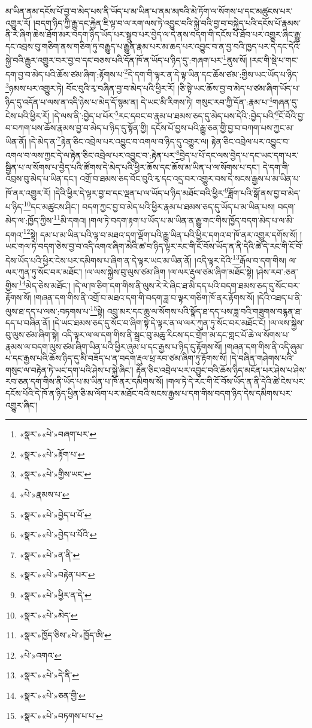 མ་ཡིན་ནམ་དངོས་པོ་བྱ་བ་མེད་པས་ནི་ཡོད་པ་མ་ཡིན་པ་ནམ་མཁའི་མེ་ཏོག་ལ་སོགས་པ་དང་མཚུངས་པར་འགྱུར་རོ། །བདག་ཉིད་ཀྱི་རྒྱུ་དང་རྐྱེན་ཇི་ལྟ་བ་ལ་རག་ལས་ཏེ་འབྱུང་བའི་སྐྱེ་བའི་བྱ་བ་བསྐྱེད་པའི་དངོས་པོ་རྣམས་ནི་རེ་ཞིག་ཆེས་ཐོག་མར་བདག་ཉིད་ཡོད་པར་སྒྲུབ་པར་བྱེད་ལ་དེ་ནས་བདག་གི་དངོས་པོ་ཐོབ་པར་འགྱུར་ཞིང་རྒྱུ་དང་འབྲས་བུ་གཅིག་ནས་གཅིག་ཏུ་བརྒྱུད་པ་རྒྱུན་རྣམ་པར་མ་ཆད་པར་འབྱུང་བ་ན་བྱ་བའི་ཁྱད་པར་དེ་དང་དེའི་སྐྱེ་བའི་རྒྱུར་འགྱུར་བར་བྱ་བ་དང་བཅས་པའི་དོན་ཁོ་ན་ཡོད་པ་ཉིད་དུ་:གཞག་པར་\footnote{«སྣར་»«པེ་»བཞག་པར་}ནུས་སོ། །རང་གི་སྡེ་པ་གང་དག་བྱ་བ་མེད་པའི་ཆོས་ཙམ་ཞིག་:རྟོགས་པ་\footnote{«སྣར་»«པེ་»རྟོག་པ་}དེ་དག་གི་ལྟར་ན་དེ་ལྟ་ཡིན་དང་ཆོས་ཙམ་:གྱིས་ཡང་ཡོད་པ་ཉིད་\footnote{«སྣར་»«པེ་»གྱིས་ཡང་}ཉམས་པར་འགྱུར་ཏེ། བོང་བུའི་རྭ་བཞིན་བྱ་བ་མེད་པའི་ཕྱིར་རོ། །ཅི་སྟེ་ཡང་ཆོས་བྱ་བ་མེད་པ་ཙམ་ཞིག་ཡོད་པ་ཉིད་དུ་འདོན་པ་ལས་ན་འདི་ཉེས་པ་མེད་དོ་སྙམ་ན། དེ་ཡང་མི་རིགས་ཏེ། གསུང་རབ་ཀྱི་དོན་:རྣམ་པ་\footnote{«པེ་»རྣམས་པ་}གཞན་དུ་ངེས་པའི་ཕྱིར་རོ། །དེ་ལས་ནི་:བྱེད་པ་པོར་\footnote{«སྣར་»«པེ་»བྱེད་པ་པོ་}རང་དབང་བ་རྣམ་པ་ཐམས་ཅད་དུ་མེད་པས་དེའི་:བྱེད་པའི་\footnote{«སྣར་»«པེ་»བྱེད་པ་པོའི་}ངོ་བོའི་བྱ་བ་བཀག་པས་ཆོས་རྣམས་བྱ་བ་མེད་པ་ཉིད་དུ་སྟོན་གྱི། དངོས་པོ་བྱས་པའི་རྒྱུ་ཅན་གྱི་བྱ་བ་བཀག་པས་ཀྱང་མ་ཡིན་ནོ། །དེ་མེད་ན་\footnote{«སྣར་»«པེ་»ན་ནི་}རྟེན་ཅིང་འབྲེལ་པར་འབྱུང་བ་འགལ་བ་ཉིད་དུ་འགྱུར་ལ། རྟེན་ཅིང་འབྲེལ་པར་འབྱུང་བ་འགལ་བ་ལས་ཀྱང་དེ་ལ་རྟེན་ཅིང་འབྲེལ་པར་འབྱུང་བ་:རྟེན་པར་\footnote{«སྣར་»«པེ་»བརྟེན་པར་}བྱེད་པ་པོ་དང་ལས་བྱེད་པ་དང་ཡང་དག་པར་སྦྱིན་པ་ལ་སོགས་པ་བྱེད་པའི་ཚོགས་དེ་མེད་པའི་ཕྱིར་ཆོས་དང་ཆོས་མ་ཡིན་པ་ལ་སོགས་པ་དང་། དེ་དག་གི་འབྲས་བུ་མེད་པ་ཡིན་དང་། འགྲོ་བ་ཐམས་ཅད་བོང་བུའི་རྭ་དང་འདྲ་བར་འགྱུར་བས་དེ་སངས་རྒྱས་པ་མ་ཡིན་པ་ཁོ་ནར་འགྱུར་རོ། །དེའི་ཕྱིར་དེ་ལྟར་བྱ་བ་དང་ལྡན་པ་ལ་ཡོད་པ་ཉིད་མཐོང་བའི་ཕྱིར་\footnote{«སྣར་»«པེ་»ཕྱིར་ན་དེ་}ཟློག་པའི་སྒོ་ནས་བྱ་བ་མེད་པ་ཉིད་\footnote{«སྣར་»«པེ་»མེད་}དང་མཚུངས་ཤིང་། བདག་ཀྱང་བྱ་བ་མེད་པའི་ཕྱིར་རྣམ་པ་ཐམས་ཅད་དུ་ཡོད་པ་མ་ཡིན་པས། བདག་མེད་ལ་:ཁྱོད་ཀྱིས་\footnote{«སྣར་»ཁྱོད་ཅིས་«པེ་»ཁྱོད་ཨི་}མི་དགའ། །གལ་ཏེ་བདག་རྟག་པ་ཡོད་པ་མ་ཡིན་ན་རྒྱུ་གང་གིས་ཁྱོད་བདག་མེད་པ་ལ་མི་དགའ་\footnote{«པེ་»འགའ་}སྟེ། དམ་པ་མ་ཡིན་པའི་ལྟ་བ་མཐའ་དག་ལྡོག་པའི་རྒྱུ་ཡིན་པའི་ཕྱིར་དགའ་བ་ཁོ་ནར་འགྱུར་དགོས་སོ། །ཡང་གལ་ཏེ་བདག་ཅེས་བྱ་བ་འདི་འགའ་ཞིག་མེའི་ཚ་བ་ཉིད་ལྟར་རང་གི་ངོ་བོས་ཡོད་ན་ནི་དེའི་ཚེ་དེ་རང་གི་ངོ་བོ་དེས་ཡོད་པའི་ཕྱིར་ངེས་པར་དམིགས་པ་ཞིག་ན་དེ་ལྟར་ཡང་མ་ཡིན་ནོ། །འདི་ལྟར་དེའི་\footnote{«སྣར་»«པེ་»དེ་ནི་}རྒོལ་བ་དག་གིས། ལ་ལར་ཀུན་ཏུ་སོང་བར་མཐོང་། །ལ་ལས་སྐྱེས་བུ་ལུས་ཙམ་ཞིག །ལ་ལར་རྡུལ་ཙམ་ཞིག་མཐོང་སྟེ། །ཤེས་རབ་:ཅན་གྱིས་\footnote{«སྣར་»«པེ་»ཅན་གྱི་}མེད་ཅེས་མཐོང་། །དེ་ལ་ཁ་ཅིག་དག་གིས་ནི་ལུས་རེ་རེ་ཞིང་ཐ་མི་དད་པའི་བདག་ཐམས་ཅད་དུ་སོང་བར་རྟོགས་སོ། །གཞན་དག་གིས་ནི་འགྲོ་བ་མཐའ་དག་གི་བདག་ཟླ་བ་ལྟར་གཅིག་ཁོ་ནར་རྟོགས་སོ། །དེའི་འཐད་པ་ནི་ལུས་ཐ་དད་པ་ལས་:བཏགས་པ་\footnote{«སྣར་»«པེ་»བཏགས་པ་པ་}སྟེ། འབྲུ་མར་དང་ཆུ་ལ་སོགས་པའི་སྣོད་ཐ་དད་པས་ཟླ་བའི་གཟུགས་བརྙན་ཐ་དད་པ་བཞིན་ནོ། །དེ་ཡང་ཐམས་ཅད་དུ་སོང་བ་ཞིག་སྟེ་དེ་ལྟར་ན་ལ་ལར་ཀུན་ཏུ་སོང་བར་མཐོང་ངོ། །ལ་ལས་སྐྱེས་བུ་ལུས་ཙམ་ཞིག་སྟེ། འདི་ལྟར་ལ་ལ་དག་གིས་ནི་སྦྲང་བུ་མཆུ་རིངས་དང་གྲོག་མ་དང་གླང་པོ་ཆེ་ལ་སོགས་པ་རྣམས་ལ་བདག་ལུས་ཙམ་ཞིག་ཡིན་པའི་ཕྱིར་ཞུམ་པ་དང་རྒྱས་པ་ཉིད་དུ་རྟོགས་སོ། །གཞན་དག་གིས་ནི་འདི་ཞུམ་པ་དང་རྒྱས་པའི་ཆོས་ཉིད་དུ་མི་བཟོད་པ་ན་བདག་རྡུལ་ཕྲ་རབ་ཙམ་ཞིག་ཏུ་རྟོགས་སོ། །དེ་བཞིན་གཤེགས་པའི་གསུང་ལ་བརྟེན་ཏེ་ཡང་དག་པའི་ཤེས་པ་སྐྱེ་ཞིང་། རྟེན་ཅིང་འབྲེལ་པར་འབྱུང་བའི་ཆོས་ཉིད་མངོན་པར་ཤེས་པ་ཤེས་རབ་ཅན་དག་གིས་ནི་ཡོད་པ་མ་ཡིན་པ་ཁོ་ནར་དམིགས་སོ། །གལ་ཏེ་དེ་རང་གི་ངོ་བོས་ཡོད་ན་ནི་དེའི་ཚེ་ངེས་པར་དངོས་པོའི་དེ་ཁོ་ན་ཉིད་ཕྱིན་ཅི་མ་ལོག་པར་མཐོང་བའི་སངས་རྒྱས་པ་དག་གིས་བདག་ཉིད་དེས་དམིགས་པར་འགྱུར་ཞིང་། 